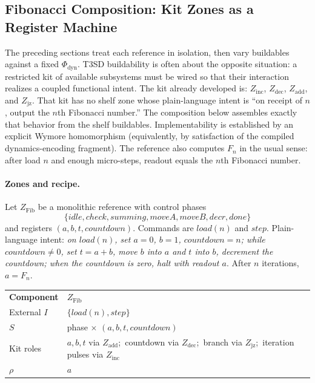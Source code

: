 \subsection{Fibonacci Composition: Kit Zones as a Register Machine}
\label{sec:case-fib}

The preceding sections treat each reference in isolation, then vary buildables against a fixed $\Phi_{\mathrm{dyn}}$. T3SD buildability is often about the opposite situation: a restricted kit of available subsystems must be wired so that their interaction realizes a coupled functional intent. The kit already developed is: $Z_{\mathrm{inc}}$, $Z_{\mathrm{dec}}$, $Z_{\mathrm{add}}$, and $Z_{\mathrm{jz}}$. That kit has no shelf zone whose plain-language intent is ``on receipt of $n$, output the $n$th Fibonacci number.'' The composition below assembles exactly that behavior from the shelf buildables. Implementability is established by an explicit Wymore homomorphism (equivalently, by satisfaction of the compiled dynamics-encoding fragment). The reference also computes $F_n$ in the usual sense: after load $n$ and enough micro-steps, readout equals the $n$th Fibonacci number.

\paragraph{Zones and recipe.}
Let $Z_{\mathrm{Fib}}$ be a monolithic reference with control phases
\[
  \{\mathit{idle},\mathit{check},\mathit{summing},\mathit{moveA},\mathit{moveB},\mathit{decr},\mathit{done}\}
\]
and registers $(a,b,t,\mathit{countdown})$. Commands are $\mathit{load}(n)$ and $\mathit{step}$. Plain-language intent: \emph{on $\mathit{load}(n)$, set $a{=}0$, $b{=}1$, $\mathit{countdown}{=}n$; while $\mathit{countdown}\neq 0$, set $t{=}a{+}b$, move $b$ into $a$ and $t$ into $b$, decrement the countdown; when the countdown is zero, halt with readout $a$}. After $n$ iterations, $a=F_n$.

\begingroup
\renewcommand{\arraystretch}{1.2}
\footnotesize
\begin{center}
\begin{tabularx}{0.92\linewidth}{@{}>{\raggedright\arraybackslash}p{2.6cm}Y@{}}
    \headingfont\bfseries Component & \headingfont\bfseries $Z_{\mathrm{Fib}}$ \\
    \addlinespace[2pt]
    External $I$ & $\{\mathit{load}(n),\mathit{step}\}$ \\
    \addlinespace[2pt]
    $S$ & phase $\times$ $(a,b,t,\mathit{countdown})$ \\
    \addlinespace[2pt]
    Kit roles & $a,b,t$ via $Z_{\mathrm{add}}$;\ countdown via $Z_{\mathrm{dec}}$;\ branch via $Z_{\mathrm{jz}}$;\ iteration pulses via $Z_{\mathrm{inc}}$ \\
    \addlinespace[2pt]
    $\rho$ & $a$ \\
\end{tabularx}
\end{center}
\label{tab:z-fib}
\endgroup
\vspace{4pt}

